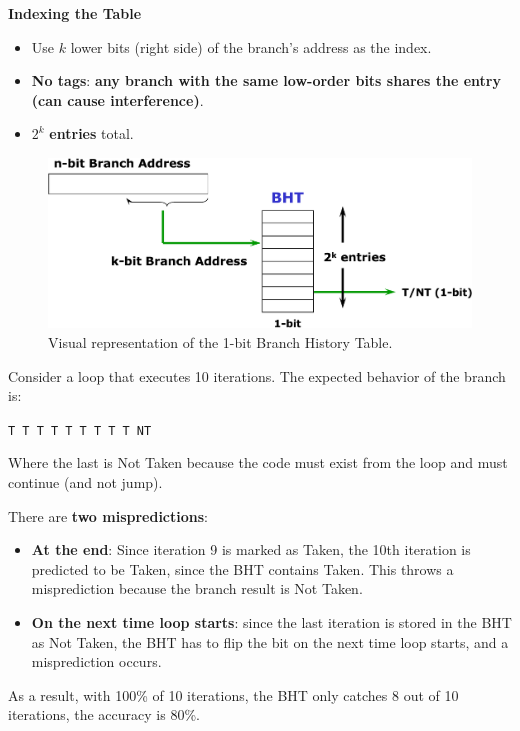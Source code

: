 \highspace
\begin{flushleft}
    \textcolor{Green3}{ \textbf{Indexing the Table}}
\end{flushleft}
\begin{itemize}
    \item Use $k$ lower bits (right side) of the branch's address as the index.
    \item[\textcolor{Red2}{\faIcon{exclamation-triangle}}] \textcolor{Red2}{\textbf{No tags}}: \textbf{any branch with the same low-order bits shares the entry (can cause interference)}.
    \item $2^{k}$ \textbf{entries} total.
\end{itemize}

\newpage

\begin{figure}[!htp]
    \centering
    \includegraphics[width=.8\textwidth]{img/1-bit-bht.pdf}
    \caption{Visual representation of the 1-bit Branch History Table.}
\end{figure}

\begin{examplebox}
    Consider a loop that executes 10 iterations. The expected behavior of the branch is:
    \begin{center}
        \texttt{T T T T T T T T T NT}
    \end{center}
    Where the last is Not Taken because the code must exist from the loop and must continue (and not jump).
    
    There are \textbf{two mispredictions}:
    \begin{itemize}
        \item \textbf{At the end}: Since iteration 9 is marked as Taken, the 10th iteration is predicted to be Taken, since the BHT contains Taken. This throws a misprediction because the branch result is Not Taken.
        \item \textbf{On the next time loop starts}: since the last iteration is stored in the BHT as Not Taken, the BHT has to flip the bit on the next time loop starts, and a misprediction occurs.
    \end{itemize}
    As a result, with 100\% of 10 iterations, the BHT only catches 8 out of 10 iterations, the accuracy is 80\%.
\end{examplebox}

